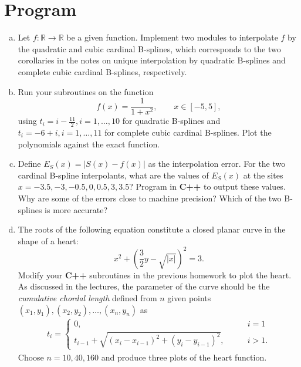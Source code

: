 \documentclass[a4paper]{book}
\numberwithin{equation}{chapter}
\theoremstyle{definition}
\begin{document}
\section{Program}\label{sec:2}

\begin{enumerate}[(a)]
\item Let $f:\mathbb{R} \rightarrow \mathbb{R}$ be a given function. Implement two modules to interpolate $f$ by the quadratic and cubic cardinal B-splines, which corresponds to the two corollaries in the notes on unique interpolation by quadratic B-splines and complete cubic cardinal B-splines, respectively.

\item Run your subroutines on the function
  \[f(x) = \frac{1}{1 + x^2}, \qquad x \in [-5,5],\]
  using $t_i = i - \frac{11}{2}, i = 1, \ldots, 10$ for quadratic B-splines and $t_i = -6 + i, i = 1, \ldots , 11$ for complete cubic cardinal B-splines. Plot the polynomials against the exact function.

\item  Define $E_S(x) = \left| S(x) - f(x) \right|$ as the interpolation error. For the two cardinal B-spline interpolants, what are the values of $E_S(x)$ at the sites $x = -3.5, -3, -0.5, 0, 0.5, 3, 3.5$? Program in \textbf{C++} to output these values. Why are some of the errors close to machine precision? Which of the two B-splines is more accurate?

\item The roots of the following equation constitute a closed planar curve in the shape of a heart:
  \[x^2 + \left(\frac{3}{2}y - \sqrt{\left| x \right|}\right)^2 = 3.\]
  Modify your \textbf{C++} subroutines in the previous homework to plot the heart. As discussed in the lectures, the parameter of the curve should be the \textit{cumulative chordal length} defined from $n$ given points $(x_1, y_1), (x_2, y_2), \ldots, (x_n, y_n)$ as
  \begin{align*}
    t_i =
    \begin{cases}
      0, \qquad & i = 1 \\
      t_{i-1} + \sqrt{(x_i - x_{i-1})^2 + (y_i - y_{i-1})^2}, \qquad & i > 1.
    \end{cases}
  \end{align*}
  Choose $n = 10, 40, 160$ and produce three plots of the heart function. 
\end{enumerate}
\end{document}
